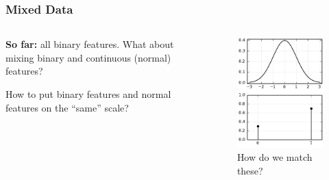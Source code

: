 \documentclass[aspectratio=1610,onlytextwidth]{beamer}
\begin{document}
\begin{frame}[c]
  \frametitle{Mixed Data}
  \begin{columns}
    \begin{column}{0.45\textwidth}
      \textbf{So far:} \alert{all} binary features. What about mixing binary and continuous (normal) features?

      \medskip

      How to put binary features and normal features on the ``same'' scale?
    \end{column}
    \begin{column}{0.45\textwidth}
      \begin{figure}[htpb]
        \centering
        \includegraphics[]{figures/mixed-data-comp.pdf}
        \caption{%
          How do we match these?
        }
      \end{figure}
    \end{column}
  \end{columns}
\end{frame}
\end{document}
